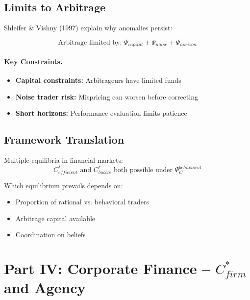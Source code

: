 \subsection{Limits to Arbitrage}

Shleifer \& Vishny (1997) explain why anomalies persist:

\begin{equation}
\boxed{
\text{Arbitrage limited by: } \Psi_{capital} + \Psi_{noise} + \Psi_{horizon}
}
\label{eq:limits-arb}
\end{equation}

\paragraph{Key Constraints.}
\begin{itemize}
    \item \textbf{Capital constraints:} Arbitrageurs have limited funds
    \item \textbf{Noise trader risk:} Mispricing can worsen before correcting
    \item \textbf{Short horizons:} Performance evaluation limits patience
\end{itemize}

\subsection{Framework Translation}

Multiple equilibria in financial markets:
\begin{equation}
C^*_{efficient} \text{ and } C^*_{bubble} \text{ both possible under } \Psi_C^{behavioral}
\end{equation}

Which equilibrium prevails depends on:
\begin{itemize}
    \item Proportion of rational vs. behavioral traders
    \item Arbitrage capital available
    \item Coordination on beliefs
\end{itemize}


\section{Part IV: Corporate Finance -- $C^*_{firm}$ and Agency}
\label{sec:Y-corporate}

